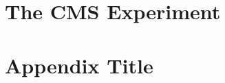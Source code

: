 \documentclass[12pt,twoside,openany]{book}
\begin{document}
\chapter{The CMS Experiment}\label{LHCCMS}


%
%
%
%
%
%
%
%
%

\appendix
\chapter{Appendix Title}
%

{}

\end{document}
